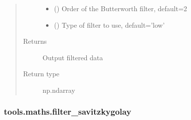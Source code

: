 \documentclass[letterpaper,10pt,english]{sphinxmanual}
\begin{document}
\begin{fulllineitems}
\begin{quote}
\begin{description}
\begin{itemize}
\item {} 
\sphinxAtStartPar
{} () \textendash{} Order of the Butterworth filter, default=2

\item {} 
\sphinxAtStartPar
{} (\sphinxstyleliteralemphasis{\sphinxupquote{, }}\sphinxstyleliteralemphasis{\sphinxupquote{, }}) \textendash{} Type of filter to use, default=’low’

\end{itemize}

\item[{Returns}] \leavevmode
\sphinxAtStartPar
{} \textendash{} Output filtered data

\item[{Return type}] \leavevmode
\sphinxAtStartPar
np.ndarray

\end{description}\end{quote}

\end{fulllineitems}



\subsubsection{tools.maths.filter\_savitzkygolay}
\label{\detokenize{_autosummary/tools.maths.filter_savitzkygolay:tools-maths-filter-savitzkygolay}}\label{\detokenize{_autosummary/tools.maths.filter_savitzkygolay::doc}}
\end{document}
